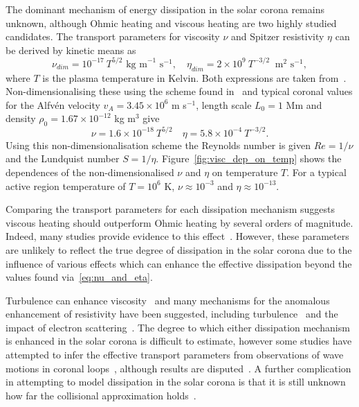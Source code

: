 The dominant mechanism of energy dissipation in the solar corona remains unknown, although Ohmic heating and viscous heating are two highly studied candidates. The transport parameters for viscosity $\nu$ and Spitzer resistivity $\eta$ can be derived by kinetic means as
\begin{equation}
  \label{eq:nu_and_eta}
\nu_{dim} = 10^{-17}\ T^{5/2} \text{ kg m}^{-1}\text{ s}^{-1}, \quad \eta_{dim} = 2\times 10^{9}\ T^{-3/2}\ \text{ m}^2 \text{ s}^{-1},
\end{equation}
where $T$ is the plasma temperature in Kelvin. Both expressions are taken from~\cite{braginskiiTransportProcessesPlasma1965}. Non-dimensionalising these using the scheme found in~\cite{arberStaggeredGridLagrangian2001} and typical coronal values for the Alfv\'en velocity $v_A = 3.45 \times 10^6$ m s$^{-1}$, length scale $L_0 = 1$ Mm and density $\rho_0 = 1.67 \times 10^{-12}$ kg m$^3$ give
\begin{equation}
  \label{eq:nondim_nu_and_eta}
\nu = 1.6 \times 10^{-18}\ T^{5/2} \quad \eta = 5.8 \times 10^{-4}\ T^{-3/2}.
\end{equation}
Using this non-dimensionalisation scheme the Reynolds number is given $Re = 1/\nu$ and the Lundquist number $S = 1/\eta$. Figure~\ref{fig:visc_dep_on_temp} shows the dependences of the non-dimensionalised $\nu$ and $\eta$ on temperature $T$. For a typical active region temperature of $T = 10^6$ K, $\nu \approx 10^{-3}$ and $\eta \approx 10^{-13}$.

Comparing the transport parameters for each dissipation mechanism suggests viscous heating should outperform Ohmic heating by several orders of magnitude. Indeed, many studies provide evidence to this effect~\cite{browningMechanismsSolarCoronal1991,craigViscousDissipation3D2013,craigAnisotropicViscousDissipation2009a,armstrongViscoResistiveDissipation2013,hollwegViscosityChewGoldbergerLowEquations1986a}. However, these parameters are unlikely to reflect the true degree of dissipation in the solar corona due to the influence of various effects which can enhance the effective dissipation beyond the values found via~\eqref{eq:nu_and_eta}. 

Turbulence can enhance viscosity~\cite{canutoTurbulentViscosity1988} and many mechanisms for the anomalous enhancement of resistivity have been suggested, including turbulence~\cite{cheHowAnomalousResistivity2017} and the impact of electron scattering~\cite{maEffectiveResistivityCollisionless2018}. The degree to which either dissipation mechanism is enhanced in the solar corona is difficult to estimate, however some studies have attempted to infer the effective transport parameters from observations of wave motions in coronal loops~\cite{nakariakovTRACEObservationDamped1999}, although results are disputed~\cite{klimchukCoronalSeismologyPropagation2004}. A further complication in attempting to model dissipation in the solar corona is that it is still unknown how far the collisional approximation holds~\cite{klimchukSolvingCoronalHeating2006a}.

